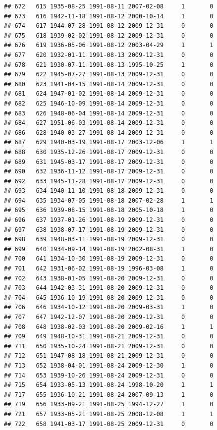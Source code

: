 \documentclass[
]{book}
\begin{document}
\begin{verbatim}
## 672   615 1935-08-25 1991-08-11 2007-02-08     1       0
## 673   616 1942-11-18 1991-08-12 2000-10-14     1       0
## 674   617 1944-07-28 1991-08-12 2009-12-31     0       0
## 675   618 1939-02-02 1991-08-12 2009-12-31     0       0
## 676   619 1936-05-06 1991-08-12 2003-04-29     1       1
## 677   620 1932-01-11 1991-08-13 2009-12-31     0       0
## 678   621 1930-07-11 1991-08-13 1995-10-25     1       0
## 679   622 1945-07-27 1991-08-13 2009-12-31     0       0
## 680   623 1941-04-15 1991-08-14 2009-12-31     0       0
## 681   624 1947-01-02 1991-08-14 2009-12-31     0       0
## 682   625 1946-10-09 1991-08-14 2009-12-31     0       0
## 683   626 1948-06-04 1991-08-14 2009-12-31     0       0
## 684   627 1951-06-03 1991-08-14 2009-12-31     0       0
## 686   628 1940-03-27 1991-08-14 2009-12-31     0       0
## 687   629 1940-03-19 1991-08-17 2003-12-06     1       1
## 688   630 1935-12-26 1991-08-17 2009-12-31     0       0
## 689   631 1945-03-17 1991-08-17 2009-12-31     0       0
## 690   632 1936-11-12 1991-08-17 2009-12-31     0       0
## 692   633 1945-11-28 1991-08-17 2009-12-31     0       0
## 693   634 1940-11-10 1991-08-18 2009-12-31     0       0
## 694   635 1934-07-05 1991-08-18 2007-02-28     1       1
## 695   636 1939-08-15 1991-08-18 2005-10-18     1       0
## 696   637 1937-01-26 1991-08-19 2009-12-31     0       0
## 697   638 1938-07-17 1991-08-19 2009-12-31     0       0
## 698   639 1948-03-11 1991-08-19 2009-12-31     0       0
## 699   640 1934-09-14 1991-08-19 2002-08-31     1       0
## 700   641 1934-10-30 1991-08-19 2009-12-31     0       0
## 701   642 1931-06-02 1991-08-19 1996-03-08     1       0
## 702   643 1938-01-05 1991-08-20 2009-12-31     0       0
## 703   644 1942-03-31 1991-08-20 2009-12-31     0       0
## 704   645 1936-10-19 1991-08-20 2009-12-31     0       0
## 706   646 1934-10-12 1991-08-20 2009-03-31     1       0
## 707   647 1942-12-07 1991-08-20 2009-12-31     0       0
## 708   648 1938-02-03 1991-08-20 2009-02-16     1       1
## 709   649 1948-10-31 1991-08-21 2009-12-31     0       0
## 711   650 1935-10-24 1991-08-21 2009-12-31     0       0
## 712   651 1947-08-18 1991-08-21 2009-12-31     0       0
## 713   652 1938-04-01 1991-08-24 2009-12-30     1       0
## 714   653 1939-10-26 1991-08-24 2009-12-31     0       0
## 715   654 1933-05-13 1991-08-24 1998-10-20     1       1
## 717   655 1936-10-21 1991-08-24 2007-09-13     1       0
## 719   656 1933-09-21 1991-08-25 1994-12-27     1       0
## 721   657 1933-05-21 1991-08-25 2008-12-08     1       1
## 722   658 1941-03-17 1991-08-25 2009-12-31     0       0

\end{verbatim}
\end{document}
